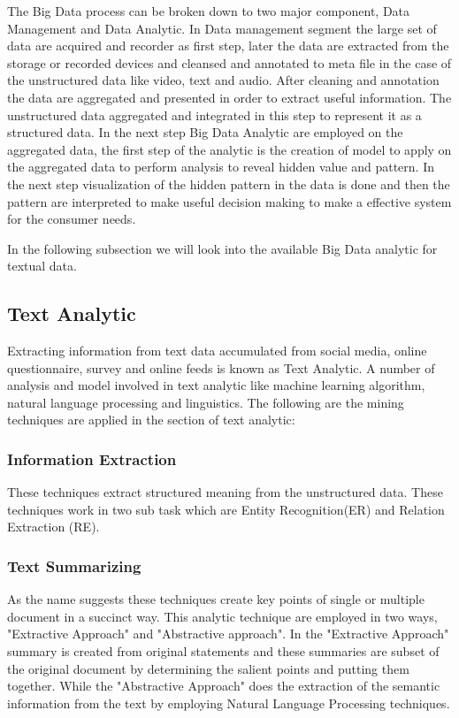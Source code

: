 \documentclass[sigconf]{acmart}
\begin{document}
The Big Data process can be broken down to two major component, Data Management and Data Analytic. In Data management segment the large set of data are acquired and recorder as first step, later the data are extracted from the storage or recorded devices and cleansed and annotated to meta file in the case of the unstructured data like video, text and audio. After cleaning and annotation the data are aggregated and presented in order to extract useful information. The unstructured data aggregated and integrated in this step to represent it as a structured data. In the next step Big Data Analytic are employed on the aggregated data, the first step of the analytic is the creation of model to apply on the aggregated data to perform analysis to reveal hidden value and pattern. In the next step visualization of the hidden pattern in the data is done and then the pattern are interpreted to make useful decision making to make a effective system for the consumer needs.

In the following subsection we will look into the available Big Data analytic for textual data.
 
 \subsection{Text Analytic}
 
 Extracting information from text data accumulated from social media, online questionnaire, survey and online feeds is known as Text Analytic. A number of analysis and model involved in text analytic like machine learning algorithm, natural language processing and linguistics. The following are the mining techniques are applied in the section of text analytic:
 
 
\subsubsection{Information Extraction}

These techniques extract structured meaning from the unstructured data. These techniques work in two sub task which are Entity Recognition(ER)\cite{bigdata} and Relation Extraction (RE)\cite{bigdata}.

\subsubsection{Text Summarizing}

As the name suggests these techniques create key points of single or multiple document in a succinct way. This analytic technique are employed in two ways, "Extractive Approach"\cite{bigdata} and "Abstractive approach"\cite{bigdata}. In the "Extractive Approach" summary is created from original statements and these summaries are subset of the original document by determining the salient points and putting them together. While the "Abstractive Approach" does the extraction of the semantic information from the text by employing Natural Language Processing techniques.
\end{document}
